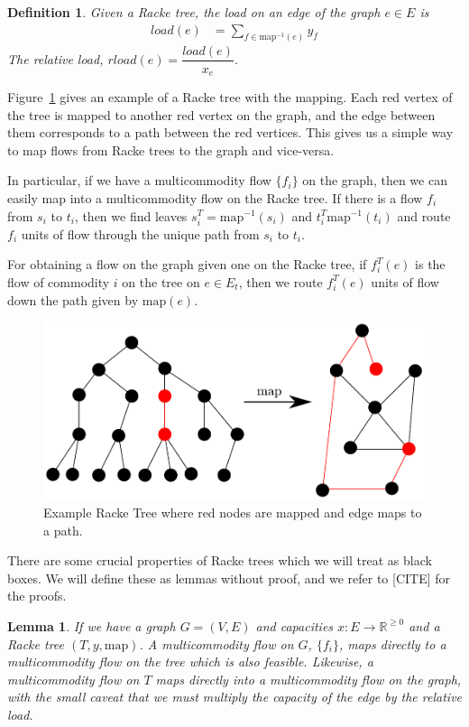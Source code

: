 \documentclass[12pt]{article}
\newtheorem{definition}{Definition}
\newtheorem{lemma}{Lemma}
\begin{document}
\begin{definition}
Given a Racke tree, the load on an edge of the graph $e \in E$ is
\begin{align}
load(e) &= \sum_{f \in \text{map}^{-1}(e)} y_f
\end{align}
The relative load, $rload(e) = \dfrac{load(e)}{x_e}$. 
\end{definition}

Figure~\ref{fig:racketree} gives an example of a Racke tree with the mapping. Each red vertex of the tree is mapped to another red vertex on the graph, and the edge between them corresponds to a path between the red vertices. This gives us a simple way to map flows from Racke trees to the graph and vice-versa. 

In particular, if we have a multicommodity flow $\{ f_i \}$ on the graph, then we can easily map into a multicommodity flow on the Racke tree. If there is a flow $f_i$ from $s_i$ to $t_i$, then we find leaves $s_i^{T}=\text{map}^{-1}(s_i)$ and $t_i^T\text{map}^{-1}(t_i)$ and route $f_i$ units of flow through the unique path from $s_i$ to $t_i$.

For obtaining a flow on the graph given one on the Racke tree, if $f_i^T(e)$ is the flow of commodity $i$ on the tree on $e \in E_t$, then we route $f_i^T(e)$ units of flow down the path given by $\text{map}(e)$.   

\begin{figure}
\label{fig:racketree}
\centering
\includegraphics[width=\linewidth]{Rackeembeddinggraph.pdf}
\caption{Example Racke Tree where red nodes are mapped and edge maps to a path.}
\end{figure}

There are some crucial properties of Racke trees which we will treat as black boxes. We will define these as lemmas without proof, and we refer to [CITE] for the proofs.

\begin{lemma}
\label{lem:mapflows}
If we have a graph $G = (V, E)$ and capacities $x: E \rightarrow \mathbb{R}^{\geq 0}$ and a Racke tree $(T, y, \text{map})$. A multicommodity flow on $G$, $\{ f_i \}$, maps directly to a multicommodity flow on the tree which is also feasible. Likewise, a multicommodity flow on $T$ maps directly into a multicommodity flow on the graph, with the small caveat that we must multiply the capacity of the edge by the relative load. 
\end{lemma}
\end{document}
